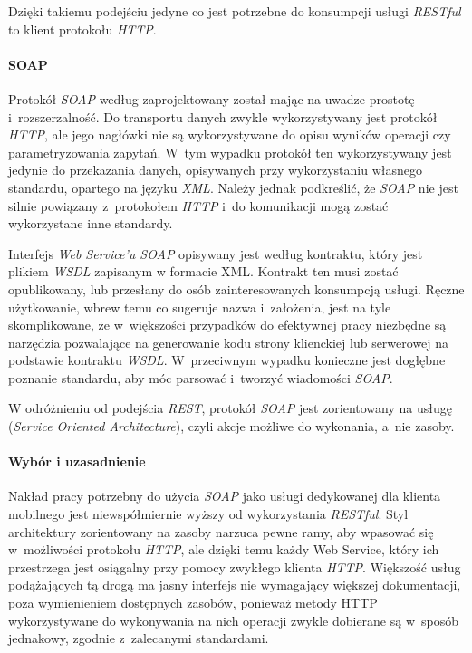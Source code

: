 \documentclass[11pt]{aghdpl}
\begin{document}
Dzięki takiemu podejściu jedyne co jest potrzebne do konsumpcji usługi \emph{RESTful} to klient protokołu \emph{HTTP}.

\paragraph{SOAP}

Protokół \emph{SOAP} według \cite{W3Soap} zaprojektowany został mając na uwadze prostotę i~rozszerzalność. Do transportu danych zwykle wykorzystywany jest protokół \emph{HTTP}, ale jego nagłówki nie są wykorzystywane do opisu wyników operacji czy parametryzowania zapytań. W~tym wypadku protokół ten wykorzystywany jest jedynie do przekazania danych, opisywanych przy wykorzystaniu własnego standardu, opartego na języku \emph{XML}. Należy jednak podkreślić, że \emph{SOAP} nie jest silnie powiązany z~protokołem \emph{HTTP} i~do komunikacji mogą zostać wykorzystane inne standardy.

Interfejs \emph{Web Service'u SOAP} opisywany jest według kontraktu, który jest plikiem \emph{WSDL} zapisanym w formacie XML. Kontrakt ten musi zostać opublikowany, lub przesłany do osób zainteresowanych konsumpcją usługi. Ręczne użytkowanie, wbrew temu co sugeruje nazwa i~założenia, jest na tyle skomplikowane, że w~większości przypadków do efektywnej pracy niezbędne są narzędzia pozwalające na generowanie kodu strony klienckiej lub serwerowej na podstawie kontraktu \emph{WSDL}. W~przeciwnym wypadku konieczne jest dogłębne poznanie standardu, aby móc parsować i~tworzyć wiadomości \emph{SOAP}.

W odróżnieniu od podejścia \emph{REST}, protokół \emph{SOAP} jest zorientowany na usługę (\emph{Service Oriented Architecture}), czyli akcje możliwe do wykonania, a~nie zasoby.

\paragraph{Wybór i uzasadnienie}

Nakład pracy potrzebny do użycia \emph{SOAP} jako usługi dedykowanej dla klienta mobilnego jest niewspółmiernie wyższy od wykorzystania \emph{RESTful}. Styl architektury zorientowany na zasoby narzuca pewne ramy, aby wpasować się w~możliwości protokołu \emph{HTTP}, ale dzięki temu każdy Web Service, który ich przestrzega jest osiągalny przy pomocy zwykłego klienta \emph{HTTP}. Większość usług podążających tą drogą ma jasny interfejs nie wymagający większej dokumentacji, poza wymienieniem dostępnych zasobów, ponieważ metody HTTP wykorzystywane do wykonywania na nich operacji zwykle dobierane są w~sposób jednakowy, zgodnie z~zalecanymi standardami.
\end{document}
